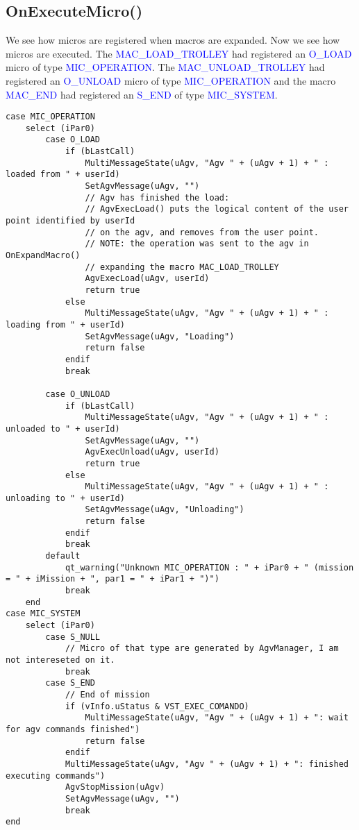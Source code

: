 %
\subsection*{OnExecuteMicro()}
We see how micros are registered when macros are expanded. Now we see how micros are executed.
The \textcolor{blue}{MAC\_LOAD\_TROLLEY} had registered an \textcolor{blue}{O\_LOAD} micro of type \textcolor{blue}{MIC\_OPERATION}.
The \textcolor{blue}{MAC\_UNLOAD\_TROLLEY} had registered an \textcolor{blue}{O\_UNLOAD} micro of type \textcolor{blue}{MIC\_OPERATION} and the macro \textcolor{blue}{MAC\_END} had registered an \textcolor{blue}{S\_END} of type \textcolor{blue}{MIC\_SYSTEM}.

\begin{lstlisting}
case MIC_OPERATION
	select (iPar0)
		case O_LOAD
			if (bLastCall)
				MultiMessageState(uAgv, "Agv " + (uAgv + 1) + " : loaded from " + userId)
				SetAgvMessage(uAgv, "")
				// Agv has finished the load:
				// AgvExecLoad() puts the logical content of the user point identified by userId
				// on the agv, and removes from the user point.
				// NOTE: the operation was sent to the agv in OnExpandMacro()
				// expanding the macro MAC_LOAD_TROLLEY
				AgvExecLoad(uAgv, userId)
				return true
			else
				MultiMessageState(uAgv, "Agv " + (uAgv + 1) + " : loading from " + userId)
				SetAgvMessage(uAgv, "Loading")
				return false
			endif
			break
	
		case O_UNLOAD
			if (bLastCall)
				MultiMessageState(uAgv, "Agv " + (uAgv + 1) + " : unloaded to " + userId)
				SetAgvMessage(uAgv, "")
				AgvExecUnload(uAgv, userId)
				return true
			else
				MultiMessageState(uAgv, "Agv " + (uAgv + 1) + " : unloading to " + userId)
				SetAgvMessage(uAgv, "Unloading")
				return false
			endif
			break
		default
			qt_warning("Unknown MIC_OPERATION : " + iPar0 + " (mission = " + iMission + ", par1 = " + iPar1 + ")")
			break
	end
case MIC_SYSTEM
	select (iPar0)
		case S_NULL
			// Micro of that type are generated by AgvManager, I am not intereseted on it.
			break
		case S_END
			// End of mission
			if (vInfo.uStatus & VST_EXEC_COMANDO)
				MultiMessageState(uAgv, "Agv " + (uAgv + 1) + ": wait for agv commands finished")
				return false
			endif
			MultiMessageState(uAgv, "Agv " + (uAgv + 1) + ": finished executing commands")
			AgvStopMission(uAgv)
			SetAgvMessage(uAgv, "")
			break
end
	
\end{lstlisting}

